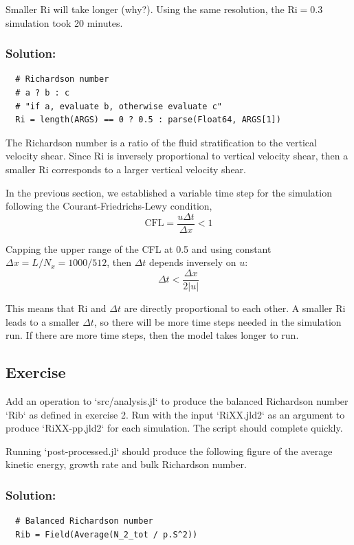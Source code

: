 \documentclass[12 pt]{article}
\numberwithin{equation}{section} %
\begin{document}
Smaller $\text{Ri}$ will take longer (why?). Using the same resolution, the $\text{Ri} = 0.3$ simulation took 20 minutes.


\subsubsection*{Solution:}
\begin{lstlisting}
  # Richardson number
  # a ? b : c
  # "if a, evaluate b, otherwise evaluate c"
  Ri = length(ARGS) == 0 ? 0.5 : parse(Float64, ARGS[1])
\end{lstlisting}

The Richardson number is a ratio of the fluid stratification to the vertical velocity shear. Since $\text{Ri}$ is inversely proportional to vertical velocity shear, then a smaller $\text{Ri}$ corresponds to a larger vertical velocity shear.

In the previous section, we established a variable time step for the simulation following the Courant-Friedrichs-Lewy condition,
\begin{equation*}
  \text{CFL} = \frac{u \Delta t}{\Delta x} < 1
\end{equation*}

Capping the upper range of the CFL at 0.5 and using constant $\Delta x = L/N_x = 1000/512$, then $\Delta t$ depends inversely on $u$:
\begin{equation*}
  \Delta t < \frac{\Delta x}{2|u|}
\end{equation*}

This means that $\text{Ri}$ and $\Delta t$ are directly proportional to each other. A smaller $\text{Ri}$ leads to a smaller $\Delta t$, so there will be more time steps needed in the simulation run. If there are more time steps, then the model takes longer to run.


\subsection{Exercise}
Add an operation to `src/analysis.jl` to produce the balanced Richardson number `Rib` as defined in exercise 2. Run with the input `RiXX.jld2` as an argument to produce `RiXX-pp.jld2` for each simulation. The script should complete quickly.

Running `post-processed.jl` should produce the following figure of the average kinetic energy, growth rate and bulk Richardson number.


\subsubsection*{Solution:}
\begin{lstlisting}
  # Balanced Richardson number
  Rib = Field(Average(N_2_tot / p.S^2))
\end{lstlisting}
\end{document}
